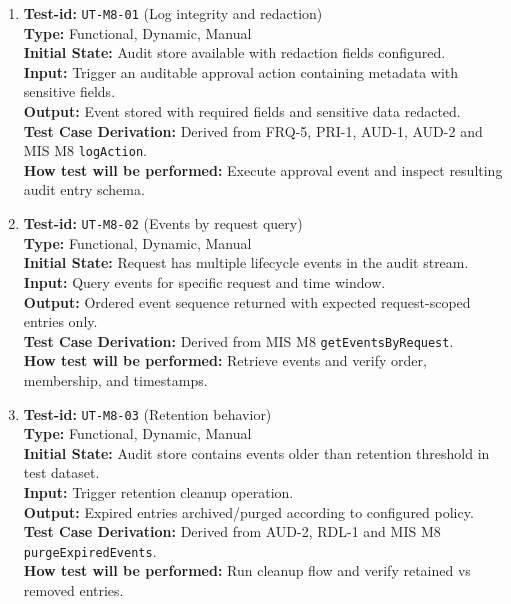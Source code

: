 \documentclass[12pt, titlepage]{article}
\begin{document}
\begin{enumerate}

\item \textbf{Test-id:} \texttt{UT-M8-01} (Log integrity and redaction)\\
\textbf{Type:} Functional, Dynamic, Manual\\
\textbf{Initial State:} Audit store available with redaction fields configured.\\
\textbf{Input:} Trigger an auditable approval action containing metadata with sensitive fields.\\
\textbf{Output:} Event stored with required fields and sensitive data redacted.\\
\textbf{Test Case Derivation:} Derived from FRQ-5, PRI-1, AUD-1, AUD-2 and MIS M8 \texttt{logAction}.\\
\textbf{How test will be performed:} Execute approval event and inspect resulting audit entry schema.

\item \textbf{Test-id:} \texttt{UT-M8-02} (Events by request query)\\
\textbf{Type:} Functional, Dynamic, Manual\\
\textbf{Initial State:} Request has multiple lifecycle events in the audit stream.\\
\textbf{Input:} Query events for specific request and time window.\\
\textbf{Output:} Ordered event sequence returned with expected request-scoped entries only.\\
\textbf{Test Case Derivation:} Derived from MIS M8 \texttt{getEventsByRequest}.\\
\textbf{How test will be performed:} Retrieve events and verify order, membership, and timestamps.

\item \textbf{Test-id:} \texttt{UT-M8-03} (Retention behavior)\\
\textbf{Type:} Functional, Dynamic, Manual\\
\textbf{Initial State:} Audit store contains events older than retention threshold in test dataset.\\
\textbf{Input:} Trigger retention cleanup operation.\\
\textbf{Output:} Expired entries archived/purged according to configured policy.\\
\textbf{Test Case Derivation:} Derived from AUD-2, RDL-1 and MIS M8 \texttt{purgeExpiredEvents}.\\
\textbf{How test will be performed:} Run cleanup flow and verify retained vs removed entries.

\end{enumerate}
\end{document}
